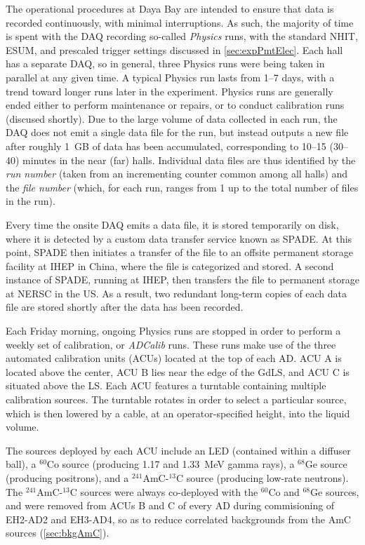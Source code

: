 \documentclass[../thesis.tex]{subfiles}
\begin{document}
The operational procedures at Daya Bay are intended to ensure that data is recorded continuously, with minimal interruptions. As such, the majority of time is spent with the DAQ recording so-called \emph{Physics} runs, with the standard NHIT, ESUM, and prescaled trigger settings discussed in \autoref{sec:expPmtElec}. Each hall has a separate DAQ, so in general, three Physics runs were being taken in parallel at any given time. A typical Physics run lasts from 1--7 days, with a trend toward longer runs later in the experiment. Physics runs are generally ended either to perform maintenance or repairs, or to conduct calibration runs (discused shortly). Due to the large volume of data collected in each run, the DAQ does not emit a single data file for the run, but instead outputs a new file after roughly 1~GB of data has been accumulated, corresponding to 10--15 (30--40) minutes in the near (far) halls. Individual data files are thus identified by the \emph{run number} (taken from an incrementing counter common among all halls) and the \emph{file number} (which, for each run, ranges from 1 up to the total number of files in the run).

Every time the onsite DAQ emits a data file, it is stored temporarily on disk, where it is detected by a custom data transfer service known as SPADE. At this point, SPADE then initiates a transfer of the file to an offsite permanent storage facility at IHEP in China, where the file is categorized and stored. A second instance of SPADE, running at IHEP, then transfers the file to permanent storage at NERSC in the US. As a result, two redundant long-term copies of each data file are stored shortly after the data has been recorded.

Each Friday morning, ongoing Physics runs are stopped in order to perform a weekly set of calibration, or \emph{ADCalib} runs. These runs make use of the three automated calibration units (ACUs) located at the top of each AD. ACU A is located above the center, ACU B lies near the edge of the GdLS, and ACU C is situated above the LS. Each ACU features a turntable containing multiple calibration sources. The turntable rotates in order to select a particular source, which is then lowered by a cable, at an operator-specified height, into the liquid volume.

The sources deployed by each ACU include an LED (contained within a diffuser ball), a $^{60}$Co source (producing 1.17 and 1.33~MeV gamma rays), a $^{68}$Ge source (producing positrons), and a $^{241}$AmC-$^{13}$C source (producing low-rate neutrons). The $^{241}$AmC-$^{13}$C sources were always co-deployed with the $^{60}$Co and $^{68}$Ge sources, and were removed from ACUs B and C of every AD during commisioning of EH2-AD2 and EH3-AD4, so as to reduce correlated backgrounds from the AmC sources (\autoref{sec:bkgAmC}).
\end{document}
